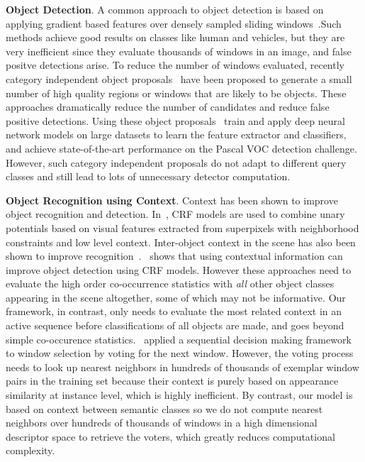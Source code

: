 {\bf Object Detection}. 
A common approach to object detection is based on applying gradient based features over densely sampled sliding windows~\cite{felzenszwalb2010object}.Such methods achieve good results on classes like human and vehicles, but they are very inefficient since they evaluate thousands of windows in an image, and false positve detections arise. To reduce the number of windows evaluated,  recently category independent object proposals~\cite{carreira2012cpmc,van2011segmentation,arbelaez2014multiscale} have been proposed to generate a small number of high quality regions or windows that are likely to be objects. These approaches dramatically reduce the number of candidates and reduce false positive detections. Using these object proposals~\cite{girshick14CVPR, BharathECCV2014} train and apply deep neural network models on large datasets to learn the feature extractor and classifiers, and achieve state-of-the-art performance on the Pascal VOC detection challenge. However, such category independent proposals do not adapt to different query classes and still lead to lots of unnecessary detector computation. 

{\bf Object Recognition using Context}. 
Context has been shown to improve object recognition and detection. In~\cite{gould2009decomposing, shotton2006textonboost, ladicky2010graph}, CRF models are used to combine unary potentials based on visual features extracted from superpixels with neighborhood constraints and low level context. Inter-object context in the scene has also been shown to improve recognition~\cite{galleguillos2010context, chen2011piecing}.~\cite{mottaghi2014role} shows that using contextual information can improve object detection using CRF models. However these approaches need to evaluate the high order co-occurrence statistics with \emph{all} other object classes appearing in the scene altogether, some of which may not be informative. Our framework, in contrast, only needs to evaluate the most related context in an active sequence before classifications of all objects are made, and goes beyond simple co-occurence statistics.~\cite{bogdan2012context} applied a sequential decision making framework to window selection by voting for the next window. However, the voting process needs to look up nearest neighbors in hundreds of thousands of exemplar window pairs in the training set because their context is purely based on appearance similarity at instance level, which is highly inefficient. By contrast, our model is based on context between semantic classes so we do not compute nearest neighbors over hundreds of thousands of windows in a high dimensional descriptor space to retrieve the voters, which greatly reduces computational complexity.
